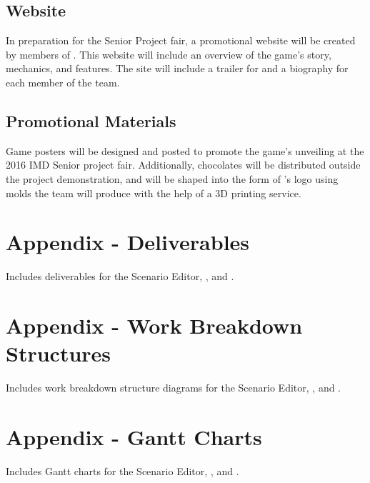 \documentclass{GlobalDocument}
\begin{document}
\section{Website}
In preparation for the Senior Project fair, a promotional website will be created by members of \ourteam{}. This website will include an overview of the game's story, mechanics, and features. The site will include a trailer for \ourgame{} and a biography for each member of the team.

\section{Promotional Materials}
Game posters will be designed and posted to promote the game's unveiling at the 2016 IMD Senior project fair. Additionally, chocolates will be distributed outside the project demonstration, and will be shaped into the form of \ourteam{}'s logo using molds the team will produce with the help of a 3D printing service.

\appendix
\chapter{Appendix - Deliverables}
\label{app:deliverables}
Includes deliverables for the Scenario Editor, \ourengine{}, and \ourgame{}.
\BgUsefalse %

\BgUsetrue %

\chapter{Appendix - Work Breakdown Structures}
\label{app:wbs}
Includes work breakdown structure diagrams for the Scenario Editor, \ourengine{}, and \ourgame{}.
\BgUsefalse %



\BgUsetrue %

\chapter{Appendix - Gantt Charts}
\label{app:gantt}
Includes Gantt charts for the Scenario Editor, \ourengine{}, and \ourgame{}.
\BgUsefalse %



\BgUsetrue %
\end{document}
